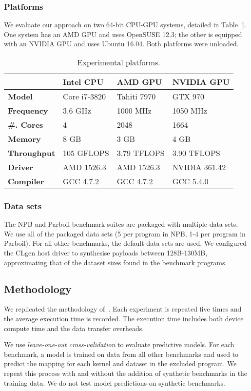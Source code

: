 \subsubsection{Platforms} We evaluate our approach on two 64-bit CPU-GPU systems, detailed in Table~\ref{tab:platforms}. One system has an AMD GPU and uses OpenSUSE 12.3; the other is equipped with an NVIDIA GPU and uses Ubuntu 16.04. Both platforms were unloaded.

\begin{table}%
  \centering %
  \begin{tabular}{l l l l}
    \toprule
    & \textbf{Intel CPU} & \textbf{AMD GPU} & \textbf{NVIDIA GPU} \\
    \midrule
    \textbf{Model} & Core i7-3820 & Tahiti 7970 & GTX 970 \\
    \textbf{Frequency} & 3.6 GHz & 1000 MHz & 1050 MHz \\
    \textbf{\#. Cores} & 4 & 2048 & 1664 \\
    \textbf{Memory} & 8 GB & 3 GB & 4 GB \\
    \textbf{Throughput} & 105 GFLOPS & 3.79 TFLOPS & 3.90 TFLOPS \\
    \textbf{Driver} & AMD 1526.3 & AMD 1526.3 & NVIDIA 361.42 \\
    \textbf{Compiler} & GCC 4.7.2 & GCC 4.7.2 & GCC 5.4.0 \\
  \end{tabular}
  \caption[Experimental platforms]{Experimental platforms.}
  \label{tab:platforms}
\end{table}

\subsubsection{Data sets} The NPB and Parboil benchmark suites are packaged with multiple data sets. We use all of the packaged data sets (5 per program in NPB, 1-4 per program in Parboil). For all other benchmarks, the default data sets are used. We configured the CLgen host driver to synthesise payloads between 128B-130MB, approximating that of the dataset sizes found in the benchmark programs.


\subsection{Methodology}

We replicated the methodology of~\cite{Grewe2013}. Each experiment is repeated five times and the average execution time is recorded. The execution time includes both device compute time and the data transfer overheads.

We use \emph{leave-one-out cross-validation} to evaluate predictive models. For each benchmark, a model is trained on data from all other benchmarks and used to predict the mapping for each kernel and dataset in the excluded program. We repeat this process with and without the addition of synthetic benchmarks in the training data. We do not test model predictions on synthetic benchmarks.
